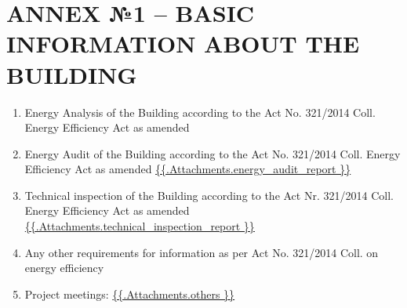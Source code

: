 \section{ANNEX №1 {–} BASIC INFORMATION ABOUT THE BUILDING}

\begin{enumerate}[label=\arabic*.]

	\item Energy Analysis of the Building according to the Act No. 321/2014 Coll. Energy Efficiency Act as amended

    \item Energy Audit of the Building according to the Act No. 321/2014 Coll. Energy Efficiency Act as amended 
\url{ {{.Attachments.energy_audit_report }} }

\iffalse attachment value="energy audit report" \fi

	\item Technical inspection of the Building according to the Act Nr. 321/2014 Coll. Energy Efficiency Act as amended
\url{ {{.Attachments.technical_inspection_report }} }

    \item Any other requirements for information as per Act No. 321/2014 Coll. on energy efficiency 

\iffalse attachment value="technical inspection report" \fi
	\item Project meetings:
          \url{ {{.Attachments.others }} }
          \iffalse attachment value="others" \fi

\end{enumerate}
